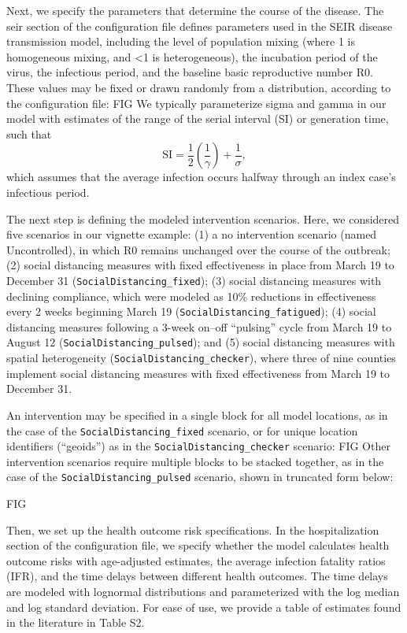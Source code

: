 Next, we specify the parameters that determine the course of the disease. The seir section of the configuration file defines parameters used in the SEIR disease transmission model, including the level of population mixing (where 1 is homogeneous mixing, and <1 is heterogeneous), the incubation period of the virus, the infectious period, and the baseline basic reproductive number R0. These values may be fixed or drawn randomly from a distribution, according to the configuration file:
FIG
We typically parameterize sigma and gamma in our model with estimates of the range of the serial interval (SI) or generation time, such that
\begin{equation}
\text{SI}=\frac{1}{2}\left(\frac{1}{\gamma }\right)+\frac{1}{\sigma },
\end{equation}
which assumes that the average infection occurs halfway through an index case’s infectious period.

The next step is defining the modeled intervention scenarios. Here, we considered five scenarios in our vignette example: (1) a no intervention scenario (named Uncontrolled), in which R0 remains unchanged over the course of the outbreak; (2) social distancing measures with fixed effectiveness in place from March 19 to December 31 (\verb|SocialDistancing_fixed|); (3) social distancing measures with declining compliance, which were modeled as 10\% reductions in effectiveness every 2 weeks beginning March 19 (\verb|SocialDistancing_fatigued|); (4) social distancing measures following a 3-week on–off “pulsing” cycle from March 19 to August 12 (\verb|SocialDistancing_pulsed|); and (5) social distancing measures with spatial heterogeneity (\verb|SocialDistancing_checker|), where three of nine counties implement social distancing measures with fixed effectiveness from March 19 to December 31.

An intervention may be specified in a single block for all model locations, as in the case of the \verb|SocialDistancing_fixed| scenario, or for unique location identifiers (“geoids”) as in the \verb|SocialDistancing_checker| scenario:
FIG
Other intervention scenarios require multiple blocks to be stacked together, as in the case of the \verb|SocialDistancing_pulsed| scenario, shown in truncated form below: 

FIG

Then, we set up the health outcome risk specifications. In the hospitalization section of the configuration file, we specify whether the model calculates health outcome risks with age-adjusted estimates, the average infection fatality ratios (IFR), and the time delays between different health outcomes. The time delays are modeled with lognormal distributions and parameterized with the log median and log standard deviation. For ease of use, we provide a table of estimates found in the literature in Table S2.

